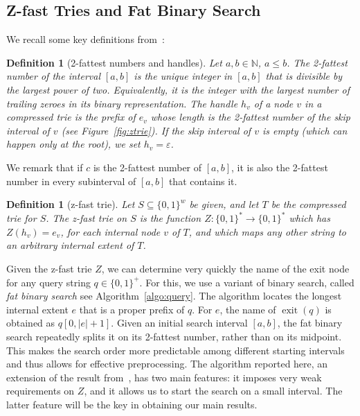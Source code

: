 \documentclass[a4paper,11pt]{article}
\newtheorem{definition}[theorem]{Definition}
\newcommand{\eps}{\varepsilon}
\newcommand{\N}{\mathbb{N}}
\newcommand{\?}{\mskip1.5mu}
\DeclareMathOperator{\exit}{exit}
\begin{document}
\subsection{Z-fast Tries and Fat Binary Search}
We recall some key definitions from~\cite{BelazzouguiBoPaVi09}:

\begin{definition}[2-fattest numbers and handles] 
\label{def:twofattest}
Let $a, b \in \N$, $a \leq b$. The \emph{2-fattest number} 
of the interval $[a, b]$ is the unique integer in $[a, b]$ 
that is divisible by the largest power of two. Equivalently, 
it is the integer with the largest number of trailing zeroes 
in its binary representation. The \emph{handle} $h_v$ of a 
node $v$ in a compressed trie is the prefix of $e_v$ whose 
length is the 2-fattest number of the skip interval of $v$
(see Figure~\ref{fig:ztrie}). If the skip interval of $v$ 
is empty (which can happen only at the root), we set 
$h_v = \eps$.
\end{definition}

We remark that if $c$ is the 2-fattest number of $[a, b]$, it 
is also the 2-fattest number in every subinterval of $[a, b]$ 
that contains it.

\begin{definition}[z-fast trie]
Let $S \subseteq \{0, 1\}^w$ be given, and let $T$ be the 
compressed trie for $S$. The \emph{z-fast trie on $S$} is 
the function $Z : \{0, 1\}^* \rightarrow \{0, 1\}^*$ which 
has $Z(h_v) = e_v$, for each internal node $v$ of $T$, and 
which maps any other string to an arbitrary internal extent
of $T$.
\end{definition}

Given the z-fast trie $Z$, we can determine very quickly
the name of the exit node for any query string $q \in \{0,1\}^+$.
For this, we use a variant of binary search, called 
\emph{fat binary search} see Algorithm~\ref{algo:query}. 
The algorithm locates the longest internal extent $e$ that is a 
proper prefix of $q$. For $e$, the name of $\exit(q)$ is obtained as
$q[0, |e| + 1]$. Given an initial search interval $[a,b]$, the 
fat binary search repeatedly splits it on its 2-fattest number, 
rather than on its midpoint. This makes the search order more
predictable among different starting intervals and thus allows 
for effective preprocessing.
The algorithm reported here, an extension of the 
result from~\cite{BelazzouguiBoVi10}, has two main features:
it imposes very weak requirements on $Z$, and it allows us to start 
the search on a small interval. The latter feature will be the key 
in obtaining our main results.
\end{document}
